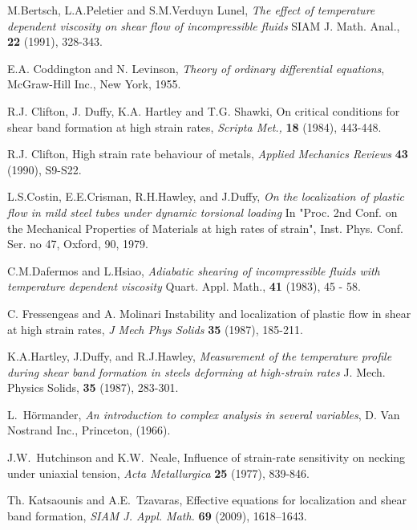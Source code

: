 \documentclass[a4paper,11pt]{article}
\theoremstyle{remark}
\begin{document}
\vfil\eject

\begin{thebibliography}{10}

{\sc M.Bertsch, L.A.Peletier and S.M.Verduyn Lunel},
{\sl The effect of temperature dependent viscosity on shear flow of incompressible fluids}
\newblock SIAM J. Math. Anal., {\bf 22} (1991), 328-343.

{\sc E.A. Coddington and N. Levinson},
{\it Theory of ordinary differential equations},
McGraw-Hill Inc., New York, 1955.

{\sc R.J. Clifton, J. Duffy, K.A. Hartley and T.G. Shawki},
{ On critical conditions for shear band formation at high strain rates}, {\it Scripta Met.,} {\bf 18} (1984), 443-448.

{\sc R.J. Clifton},  High strain rate behaviour of metals,
{\it Applied Mechanics Reviews}
{\bf 43} (1990), S9-S22.

{\sc L.S.Costin, E.E.Crisman, R.H.Hawley, and J.Duffy},
{\sl On the localization of plastic flow in mild steel tubes under dynamic torsional loading}
 In "Proc. 2nd Conf. on the Mechanical Properties of Materials at high rates of strain",  
 Inst. Phys. Conf. Ser. no 47, Oxford, 90, 1979.

{\sc C.M.Dafermos and L.Hsiao},
{\sl Adiabatic shearing of incompressible fluids with temperature dependent viscosity}
Quart. Appl. Math., {\bf 41} (1983), 45 - 58.

{\sc C. Fressengeas and A. Molinari }
{ Instability and localization of plastic flow in shear at high strain rates}, {\it J Mech Phys Solids} {\bf 35} (1987), 185-211.

{\sc K.A.Hartley, J.Duffy, and R.J.Hawley},
{\sl Measurement of the temperature profile during shear band formation in steels deforming at high-strain rates}
 J. Mech. Physics Solids, {\bf 35} (1987), 283-301.

{\sc L.~H\"ormander},
{\it An introduction to complex analysis in several variables},
D. Van Nostrand Inc., Princeton, (1966).


{\sc J.W.~Hutchinson and K.W.~Neale},
Influence of strain-rate sensitivity on necking under uniaxial tension,
{\it  Acta Metallurgica} {\bf 25} (1977), 839-846.

{\sc Th. Katsaounis and A.E.~Tzavaras},
Effective equations for localization and shear band formation,
{\it SIAM J. Appl. Math.}  {\bf 69} (2009), 1618--1643.


\end{thebibliography}
\end{document}
